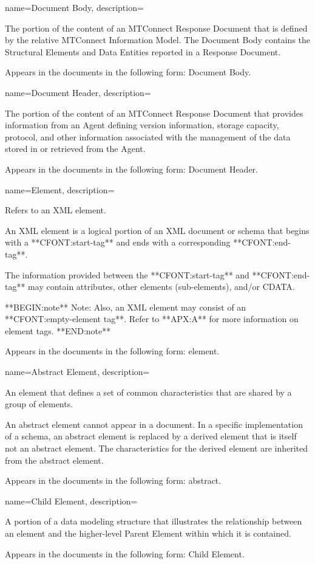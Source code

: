 {
    name={Document Body},
	description={
	The portion of the content of an \gls{MTConnect Response Document} that is defined by the relative \gls{MTConnect Information Model}. The \gls{Document Body} contains the \gls{Structural Elements} and \gls{Data Entities} reported in a \gls{Response Document}.

	Appears in the documents in the following form: \gls{Document Body}.
}
}

{
    name={Document Header},
	description={
	The portion of the content of an \gls{MTConnect Response Document} that provides information from an \gls{Agent} defining version information, storage capacity, protocol, and other information associated with the management of the data stored in or retrieved from the \gls{Agent}.
	
	Appears in the documents in the following form: \gls{Document Header}.
}
}

{
    name={Element},
	description={
	Refers to an XML element.

	An XML element is a logical portion of an XML document or schema that begins with a **CFONT:start-tag** and ends with a corresponding **CFONT:end-tag**.  

	The information provided between the **CFONT:start-tag** and **CFONT:end-tag** may contain attributes, other elements (sub-elements), and/or CDATA.

    **BEGIN:note**
	Note:  Also, an XML element may consist of an **CFONT:empty-element tag**.  Refer to **APX:A** for more information on element tags.
    **END:note**
    
	Appears in the documents in the following form: element.
}
}

{
    name={Abstract Element},
	description={
  An element that defines a set of common characteristics that are shared by a group of elements.
  
  An abstract element cannot appear in a document. In a specific implementation of a schema, an abstract element is replaced by a derived element that is itself not an abstract element. The characteristics for the derived element are inherited from the abstract element. 
  
  Appears in the documents in the following form: abstract.
}
}

{
    name={Child Element},
	description={
  A portion of a data modeling structure that illustrates the relationship between an element and the higher-level \gls{Parent Element} within which it is contained.
  
  Appears in the documents in the following form: \gls{Child Element}.
}
}

